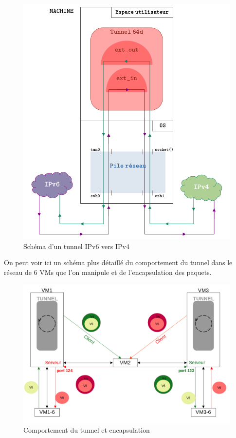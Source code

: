 \documentclass[a4paper, 10pt]{article}
\begin{document}
      \begin{figure}[h]
        \centering
        \includegraphics[scale=0.44]{img/schema_tunnel.png}
        \caption{Schéma d'un tunnel IPv6 vers IPv4}
      \end{figure}

      On peut voir ici un schéma plus détaillé du comportement du tunnel dans le
      réseau de 6 VMs que l'on manipule et de l'encapsulation des paquets.

      \begin{figure}[h]
        \centering
        \includegraphics[scale=0.44]{img/explication.png}
        \caption{Comportement du tunnel et encapsulation}
      \end{figure}
\end{document}
